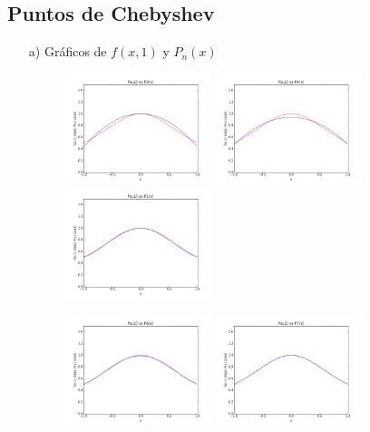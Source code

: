 \documentclass[spanish, fleqn]{article}
\begin{document}
	\subsection{Puntos de Chebyshev}
	\begin{enumerate}
		\item[a)]
			Gráficos de $f(x,1)$ y $P_n(x)$\\
			\begin{figure}[ht!]
				\centering
				\includegraphics[width=162px]{Graficos/pol3.png}
				\includegraphics[width=162px]{Graficos/pol4.png}
				\includegraphics[width=162px]{Graficos/pol5.png}
			\end{figure}
			\begin{figure}[ht!]
				\centering
				\includegraphics[width=162px]{Graficos/pol6.png}
				\includegraphics[width=162px]{Graficos/pol7.png}

\end{figure}
\end{enumerate}
\end{document}
